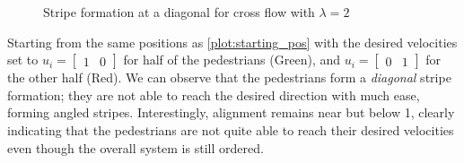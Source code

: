 \begin{itemize}
\begin{figure}[H]
\begin{subfigure}{.49\textwidth}
            \label{plot:cross2_alignment}
        \end{subfigure}
        \caption{Stripe formation at a diagonal for cross flow with $\lambda = 2$}
        \label{plot:cross2}
    \end{figure}
Starting from the same positions as \autoref{plot:starting_pos} with the desired velocities set to $u_i = \begin{bmatrix} 1 & 0 \end{bmatrix}$ for half of the pedestrians (Green), and $u_i = \begin{bmatrix} 0 & 1 \end{bmatrix}$ for the other half (Red). We can observe that the pedestrians form a \textit{diagonal} stripe formation; they are not able to reach the desired direction with much ease, forming angled stripes. Interestingly, alignment remains near but below 1, clearly indicating that the pedestrians are not quite able to reach their desired velocities even though the overall system is still ordered.


\end{itemize}
